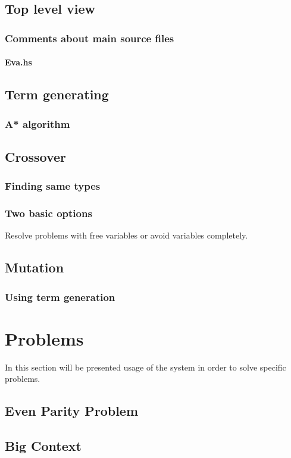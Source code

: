 \documentclass[12pt,a4paper]{report}
\begin{document}
	\section{Top level view}
		\subsection{Comments about main source files}
			\subsubsection{ Eva.hs }
	\section{Term generating}
		\subsection{A* algorithm}
	\section{Crossover}
		\subsection{Finding same types}
		\subsection{Two basic options}
		Resolve problems with free variables or avoid variables completely. 
		
	\section{Mutation}
		\subsection{Using term generation}


\chapter{Problems}
	In this section will be presented usage of the system in order to solve specific problems.
		
	
		\section{Even Parity Problem}
		\section{Big Context}
\end{document}
